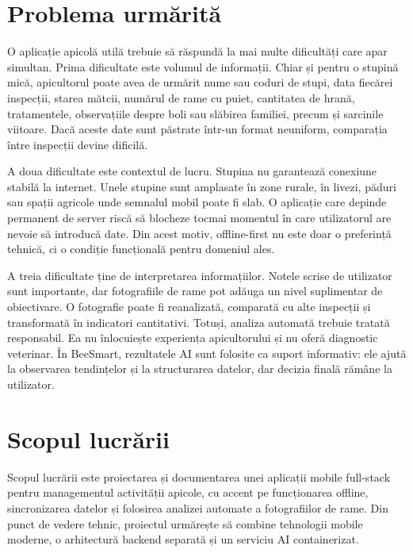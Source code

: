 \section{Problema urmărită}

O aplicație apicolă utilă trebuie să răspundă la mai multe dificultăți care apar simultan. Prima dificultate este volumul de informații. Chiar și pentru o stupină mică, apicultorul poate avea de urmărit nume sau coduri de stupi, data fiecărei inspecții, starea mătcii, numărul de rame cu puiet, cantitatea de hrană, tratamentele, observațiile despre boli sau slăbirea familiei, precum și sarcinile viitoare. Dacă aceste date sunt păstrate într-un format neuniform, comparația între inspecții devine dificilă.

A doua dificultate este contextul de lucru. Stupina nu garantează conexiune stabilă la internet. Unele stupine sunt amplasate în zone rurale, în livezi, păduri sau spații agricole unde semnalul mobil poate fi slab. O aplicație care depinde permanent de server riscă să blocheze tocmai momentul în care utilizatorul are nevoie să introducă date. Din acest motiv, offline-first nu este doar o preferință tehnică, ci o condiție funcțională pentru domeniul ales.

A treia dificultate ține de interpretarea informațiilor. Notele scrise de utilizator sunt importante, dar fotografiile de rame pot adăuga un nivel suplimentar de obiectivare. O fotografie poate fi reanalizată, comparată cu alte inspecții și transformată în indicatori cantitativi. Totuși, analiza automată trebuie tratată responsabil. Ea nu înlocuiește experiența apicultorului și nu oferă diagnostic veterinar. În BeeSmart, rezultatele AI sunt folosite ca suport informativ: ele ajută la observarea tendințelor și la structurarea datelor, dar decizia finală rămâne la utilizator.

\section{Scopul lucrării}

Scopul lucrării este proiectarea și documentarea unei aplicații mobile full-stack pentru managementul activității apicole, cu accent pe funcționarea offline, sincronizarea datelor și folosirea analizei automate a fotografiilor de rame. Din punct de vedere tehnic, proiectul urmărește să combine tehnologii mobile moderne, o arhitectură backend separată și un serviciu AI containerizat.

